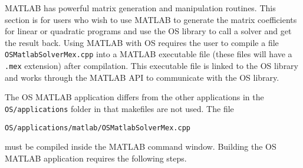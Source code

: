 \label{section:usingmatlab}

MATLAB has powerful matrix generation and manipulation routines. This section is for users who wish to use MATLAB to generate the matrix coefficients for linear or quadratic programs and use the OS library to call a solver and get the result back. Using MATLAB with OS requires the user to compile a file {\tt OSMatlabSolverMex.cpp} into a MATLAB executable file (these files will have a {\tt .mex} extension) after compilation. This executable file is linked to the OS library and works through the MATLAB API to communicate with the OS library. 



The OS MATLAB application differs from the other applications in the {\tt OS/applications} folder in that makefiles are not used.  The file 
\begin{verbatim}
OS/applications/matlab/OSMatlabSolverMex.cpp
\end{verbatim}
must be compiled inside the MATLAB command window.  Building the OS MATLAB application requires the following steps. 


